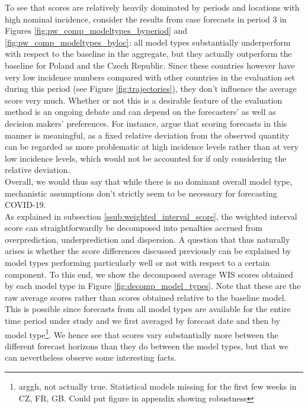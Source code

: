 To see that scores are relatively heavily dominated by periods and locations with high nominal incidence, consider the results from case forecasts in period 3 in Figures \ref{fig:pw_comp_modeltypes_byperiod} and \ref{fig:pw_comp_modeltypes_byloc}: all model types substantially underperform with respect to the baseline in the aggregate, but they actually outperform the baseline for Poland and the Czech Republic. Since these countries however have very low incidence numbers compared with other countries in the evaluation set during this period (see Figure \ref{fig:trajectories}), they don't influence the average score very much. Whether or not this is a desirable feature of the evaluation method is an ongoing debate and can depend on the forecasters' as well as decision makers' preferences. For instance, \cite{bracher_evaluating_2021} argue that scoring forecasts in this manner is meaningful, as a fixed relative deviation from the observed quantity can be regarded as more problematic at high incidence levels rather than at very low incidence levels, which would not be accounted for if only considering the relative deviation.\\  
Overall, we would thus say that while there is no dominant overall model type, mechanistic assumptions don't strictly seem to be necessary for forecasting COVID-19.\\
As explained in subsection \ref{ssub:weighted_interval_score}, the weighted interval score can straightforwardly be decomposed into penalties accrued from overprediction, underprediction and dispersion. A question that thus naturally arises is whether the score differences discussed previously can be explained by model types performing particularly well or not with respect to a certain component. To this end, we show the decomposed average WIS scores obtained by each model type in Figure \ref{fig:decomp_model_types}. Note that these are the raw average scores rather than scores obtained relative to the baseline model. This is possible since forecasts from all model types are available for the entire time period under study and we first averaged by forecast date and then by model type\footnote{arggh, not actually true. Statistical models missing for the first few weeks in CZ, FR, GB. Could put figure in appendix showing robustness}. We hence see that scores vary substantially more between the different forecast horizons than they do between the model types, but that we can nevertheless observe some interesting facts. 
